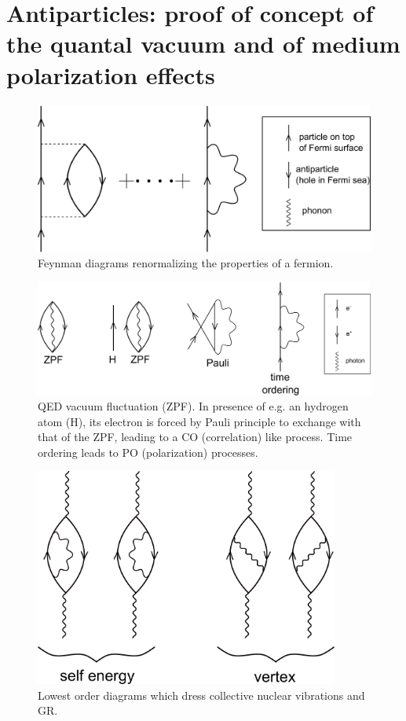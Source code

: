 \section[Vacuum and medium polarization]{Antiparticles: proof of concept of the quantal vacuum and of medium polarization effects}\label{C6AppCx}
 \begin{figure}
\centerline{\includegraphics*[width=13cm,angle=0]{C6/figs_C6/fig6_C1x}}
\caption{Feynman diagrams renormalizing the properties of a fermion.}\label{fig6_C1x}
\end{figure}
 \begin{figure}
	\centerline{\includegraphics*[width=15cm,angle=0]{C6/figs_C6/fig6_C2x}}
\caption{QED vacuum fluctuation (ZPF). In presence of e.g. an 	hydrogen atom (H), its electron is forced by Pauli principle to exchange with that of the ZPF, leading to a  CO (correlation) like process. Time ordering leads to PO (polarization) processes.}\label{fig6_C2x}
\end{figure}
 \begin{figure}
\centerline{\includegraphics*[width=10cm,angle=0]{C6/figs_C6/fig6_C3x}}
\caption{Lowest order diagrams which dress collective nuclear vibrations and GR.}\label{fig6_C3x}
\end{figure}

